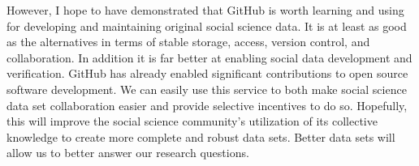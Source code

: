 \documentclass[twocolumn]{article}\usepackage{graphicx, color}
\begin{document}
However, I hope to have demonstrated that GitHub is worth learning and using for developing and maintaining original social science data. It is at least as good as the alternatives in terms of stable storage, access, version control, and collaboration. In addition it is far better at enabling social data development and verification. GitHub has already enabled significant contributions to open source software development. We can easily use this service to both make social science data set collaboration easier and provide selective incentives to do so. Hopefully, this will improve the social science community's utilization of its collective knowledge to create more complete and robust data sets. Better data sets will allow us to better answer our research questions.






\end{document}
